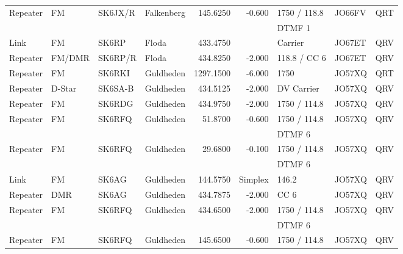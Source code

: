 \begin{longtable}{llllrrlll}
Repeater & FM        & SK6JX/R  & Falkenberg        & 145.6250     & -0.600     & 1750 / 118.8 & JO66FV      & QRT      \\
         &           &          &                   &              &            & DTMF 1       &             &          \\
Link     & FM        & SK6RP    & Floda             & 433.4750     &            & Carrier      & JO67ET      & QRV      \\
Repeater & FM/DMR    & SK6RP/R  & Floda             & 434.8250     & -2.000     & 118.8 / CC 6 & JO67ET      & QRV      \\
Repeater & FM        & SK6RKI   & Guldheden         & 1297.1500    & -6.000     & 1750         & JO57XQ      & QRT      \\
Repeater & D-Star    & SK6SA-B  & Guldheden         & 434.5125     & -2.000     & DV Carrier   & JO57XQ      & QRV      \\
Repeater & FM        & SK6RDG   & Guldheden         & 434.9750     & -2.000     & 1750 / 114.8 & JO57XQ      & QRV      \\
Repeater & FM        & SK6RFQ   & Guldheden         & 51.8700      & -0.600     & 1750 / 114.8 & JO57XQ      & QRV      \\
         &           &          &                   &              &            & DTMF 6       &             &          \\
Repeater & FM        & SK6RFQ   & Guldheden         & 29.6800      & -0.100     & 1750 / 114.8 & JO57XQ      & QRV      \\
         &           &          &                   &              &            & DTMF 6       &             &          \\
Link     & FM        & SK6AG    & Guldheden         & 144.5750     & Simplex    & 146.2        & JO57XQ      & QRV      \\
Repeater & DMR       & SK6AG    & Guldheden         & 434.7875     & -2.000     & CC 6         & JO57XQ      & QRV      \\
Repeater & FM        & SK6RFQ   & Guldheden         & 434.6500     & -2.000     & 1750 / 114.8 & JO57XQ      & QRV      \\
         &           &          &                   &              &            & DTMF 6       &             &          \\
Repeater & FM        & SK6RFQ   & Guldheden         & 145.6500     & -0.600     & 1750 / 114.8 & JO57XQ      & QRV      \\

\end{longtable}
